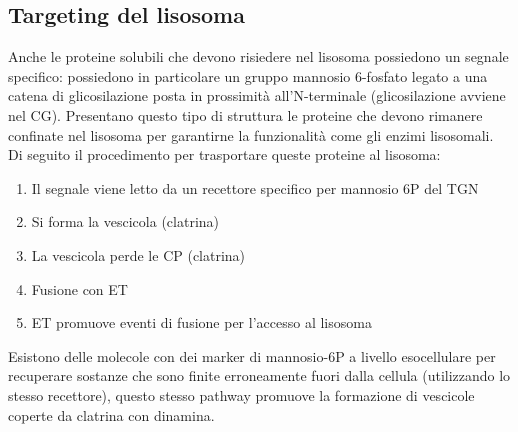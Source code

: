     \subsection{Targeting del lisosoma}
        Anche le proteine solubili che devono risiedere nel lisosoma possiedono un segnale specifico: possiedono in particolare un gruppo mannosio 6-fosfato legato a una catena di glicosilazione posta in prossimità all'N-terminale (glicosilazione avviene nel CG).
        Presentano questo tipo di struttura le proteine che devono rimanere confinate nel lisosoma per garantirne la funzionalità come gli enzimi lisosomali.\\
        Di seguito il procedimento per trasportare queste proteine al lisosoma:
        \begin{enumerate}
            \item Il segnale viene letto da un recettore specifico per mannosio 6P del TGN
            \item Si forma la vescicola (clatrina)
            \item La vescicola perde le CP (clatrina)
            \item Fusione con ET
            \item ET promuove eventi di fusione per l'accesso al lisosoma
        \end{enumerate}
        Esistono delle molecole con dei marker di mannosio-6P a livello esocellulare per recuperare sostanze che sono finite erroneamente fuori dalla cellula (utilizzando lo stesso recettore), questo stesso pathway promuove la formazione di vescicole coperte da clatrina con dinamina. 

